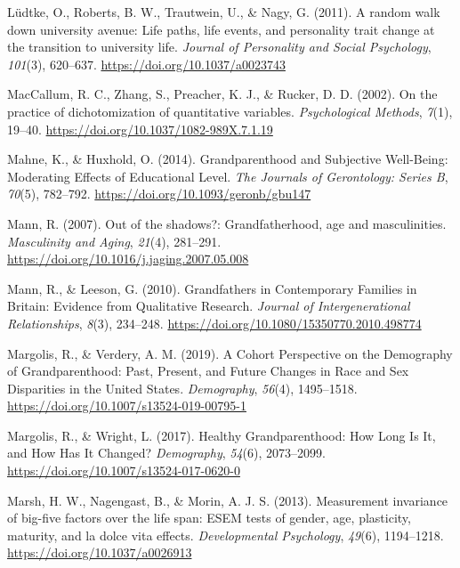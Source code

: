 \documentclass[
  english,
  man,floatsintext]{apa7}
\begin{document}
\leavevmode\hypertarget{ref-ludtkeRandomWalkUniversity2011}{}%
Lüdtke, O., Roberts, B. W., Trautwein, U., \& Nagy, G. (2011). A random walk down university avenue: Life paths, life events, and personality trait change at the transition to university life. \emph{Journal of Personality and Social Psychology}, \emph{101}(3), 620--637. \url{https://doi.org/10.1037/a0023743}

\leavevmode\hypertarget{ref-maccallumPracticeDichotomizationQuantitative2002}{}%
MacCallum, R. C., Zhang, S., Preacher, K. J., \& Rucker, D. D. (2002). On the practice of dichotomization of quantitative variables. \emph{Psychological Methods}, \emph{7}(1), 19--40. \url{https://doi.org/10.1037/1082-989X.7.1.19}

\leavevmode\hypertarget{ref-mahneGrandparenthoodSubjectiveWellBeing2014}{}%
Mahne, K., \& Huxhold, O. (2014). Grandparenthood and Subjective Well-Being: Moderating Effects of Educational Level. \emph{The Journals of Gerontology: Series B}, \emph{70}(5), 782--792. \url{https://doi.org/10.1093/geronb/gbu147}

\leavevmode\hypertarget{ref-mannOutShadowsGrandfatherhood2007}{}%
Mann, R. (2007). Out of the shadows?: Grandfatherhood, age and masculinities. \emph{Masculinity and Aging}, \emph{21}(4), 281--291. \url{https://doi.org/10.1016/j.jaging.2007.05.008}

\leavevmode\hypertarget{ref-mannGrandfathersContemporaryFamilies2010}{}%
Mann, R., \& Leeson, G. (2010). Grandfathers in Contemporary Families in Britain: Evidence from Qualitative Research. \emph{Journal of Intergenerational Relationships}, \emph{8}(3), 234--248. \url{https://doi.org/10.1080/15350770.2010.498774}

\leavevmode\hypertarget{ref-margolisCohortPerspectiveDemography2019}{}%
Margolis, R., \& Verdery, A. M. (2019). A Cohort Perspective on the Demography of Grandparenthood: Past, Present, and Future Changes in Race and Sex Disparities in the United States. \emph{Demography}, \emph{56}(4), 1495--1518. \url{https://doi.org/10.1007/s13524-019-00795-1}

\leavevmode\hypertarget{ref-margolisHealthyGrandparenthoodHow2017}{}%
Margolis, R., \& Wright, L. (2017). Healthy Grandparenthood: How Long Is It, and How Has It Changed? \emph{Demography}, \emph{54}(6), 2073--2099. \url{https://doi.org/10.1007/s13524-017-0620-0}

\leavevmode\hypertarget{ref-marshMeasurementInvarianceBigfive2013}{}%
Marsh, H. W., Nagengast, B., \& Morin, A. J. S. (2013). Measurement invariance of big-five factors over the life span: ESEM tests of gender, age, plasticity, maturity, and la dolce vita effects. \emph{Developmental Psychology}, \emph{49}(6), 1194--1218. \url{https://doi.org/10.1037/a0026913}
\end{document}
